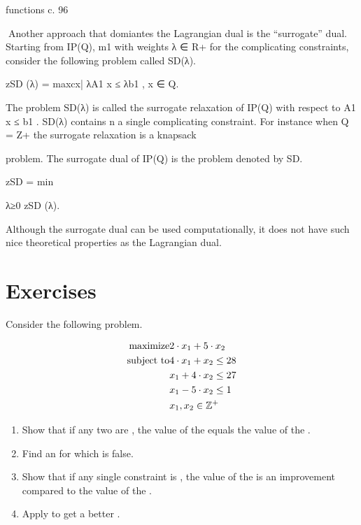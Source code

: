 functions c.
96

Another approach that domiantes the Lagrangian dual is the “surrogate” dual. Starting from IP(Q),
m1
with weights λ ∈ R+
for the complicating constraints, consider the following problem called SD(λ).

zSD (λ) = max{cx| λA1 x ≤ λb1 , x ∈ Q}.

The problem SD(λ) is called the surrogate relaxation of IP(Q) with respect to A1 x ≤ b1 . SD(λ) contains
n
a single complicating constraint. For instance when Q = Z+
the surrogate relaxation is a knapsack

problem. The surrogate dual of IP(Q) is the problem denoted by SD.

zSD = min

λ≥0 zSD (λ).

Although the surrogate dual can be used computationally, it does not have such nice theoretical properties
as the Lagrangian dual.

\section*{Exercises}
\begin{exercise}
Consider the following problem.

\begin{eqnarray}
\mbox{maximize}&2\cdot x_1+5\cdot x_2\eqnlab{ex71-m}\\
\mbox{subject to}&4\cdot x_1+x_2\leq28\eqnlab{ex71-c1}\\
&x_1+4\cdot x_2\leq27\eqnlab{ex71-c2}\\
&x_1-5\cdot x_2\leq1\eqnlab{ex71-c3}\\
&x_1,x_2\in\ZZZ^+\eqnlab{ex71-c4}
\end{eqnarray}

\begin{enumerate}
 \item {} Show that if any two  are , the value of the  equals the value of the .
 \item Find an  for which  is false.
 \item Show that if any single constraint is , the value of the  is an improvement compared to the value of the .
 \item Apply  to get a better .
\end{enumerate}
\end{exercise}

